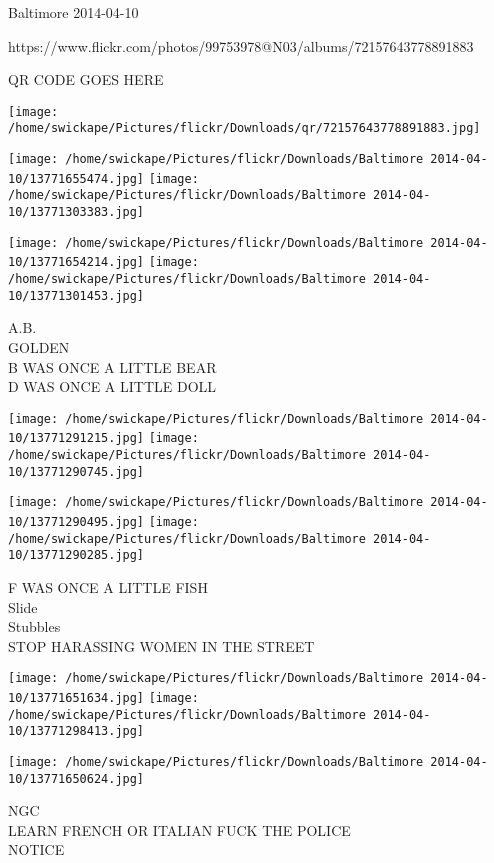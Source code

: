 \documentclass[10pt,letterpaper]{article}
\begin{document}
Baltimore 2014-04-10

https://www.flickr.com/photos/99753978@N03/albums/72157643778891883

QR CODE GOES HERE

\texttt{[image: /home/swickape/Pictures/flickr/Downloads/qr/72157643778891883.jpg]}
\pagebreak

\texttt{[image: /home/swickape/Pictures/flickr/Downloads/Baltimore 2014-04-10/13771655474.jpg]}
\texttt{[image: /home/swickape/Pictures/flickr/Downloads/Baltimore 2014-04-10/13771303383.jpg]}

\texttt{[image: /home/swickape/Pictures/flickr/Downloads/Baltimore 2014-04-10/13771654214.jpg]}
\texttt{[image: /home/swickape/Pictures/flickr/Downloads/Baltimore 2014-04-10/13771301453.jpg]}

A.B.\\
GOLDEN\\
B WAS ONCE A LITTLE BEAR\\
D WAS ONCE A LITTLE DOLL\\
\pagebreak

\texttt{[image: /home/swickape/Pictures/flickr/Downloads/Baltimore 2014-04-10/13771291215.jpg]}
\texttt{[image: /home/swickape/Pictures/flickr/Downloads/Baltimore 2014-04-10/13771290745.jpg]}

\texttt{[image: /home/swickape/Pictures/flickr/Downloads/Baltimore 2014-04-10/13771290495.jpg]}
\texttt{[image: /home/swickape/Pictures/flickr/Downloads/Baltimore 2014-04-10/13771290285.jpg]}

F WAS ONCE A LITTLE FISH\\
Slide\\
Stubbles\\
STOP HARASSING WOMEN IN THE STREET\\
\pagebreak

\texttt{[image: /home/swickape/Pictures/flickr/Downloads/Baltimore 2014-04-10/13771651634.jpg]}
\texttt{[image: /home/swickape/Pictures/flickr/Downloads/Baltimore 2014-04-10/13771298413.jpg]}

\vspace{0.25in}
\texttt{[image: /home/swickape/Pictures/flickr/Downloads/Baltimore 2014-04-10/13771650624.jpg]}

NGC\\
LEARN FRENCH OR ITALIAN FUCK THE POLICE\\
NOTICE\\
\pagebreak
\end{document}

